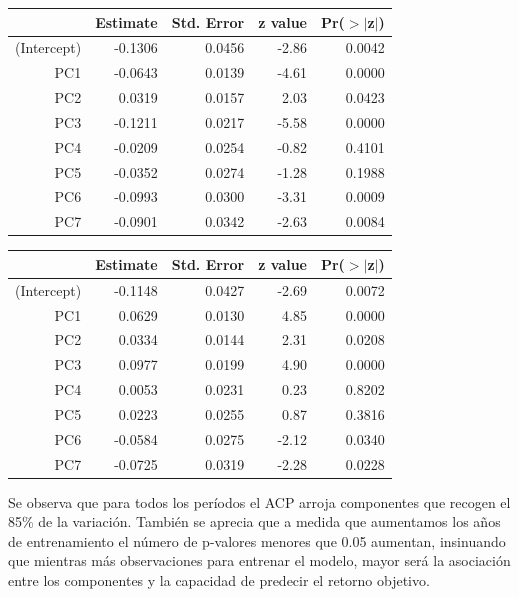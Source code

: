 \documentclass[a4paper,12pt]{Latex/Classes/PhDthesisPSnPDF}
\begin{document}
\begin{table}[ht]
\centering
\begin{tabular}{rrrrr}
  \hline
 & Estimate & Std. Error & z value & Pr($>$$|$z$|$) \\ 
  \hline
(Intercept) & -0.1306 & 0.0456 & -2.86 & 0.0042 \\ 
  PC1 & -0.0643 & 0.0139 & -4.61 & 0.0000 \\ 
  PC2 & 0.0319 & 0.0157 & 2.03 & 0.0423 \\ 
  PC3 & -0.1211 & 0.0217 & -5.58 & 0.0000 \\ 
  PC4 & -0.0209 & 0.0254 & -0.82 & 0.4101 \\ 
  PC5 & -0.0352 & 0.0274 & -1.28 & 0.1988 \\ 
  PC6 & -0.0993 & 0.0300 & -3.31 & 0.0009 \\ 
  PC7 & -0.0901 & 0.0342 & -2.63 & 0.0084 \\ 
   \hline
\end{tabular}
\end{table}\newpage
{}
\begin{table}[ht]
\centering
\begin{tabular}{rrrrr}
  \hline
 & Estimate & Std. Error & z value & Pr($>$$|$z$|$) \\ 
  \hline
(Intercept) & -0.1148 & 0.0427 & -2.69 & 0.0072 \\ 
  PC1 & 0.0629 & 0.0130 & 4.85 & 0.0000 \\ 
  PC2 & 0.0334 & 0.0144 & 2.31 & 0.0208 \\ 
  PC3 & 0.0977 & 0.0199 & 4.90 & 0.0000 \\ 
  PC4 & 0.0053 & 0.0231 & 0.23 & 0.8202 \\ 
  PC5 & 0.0223 & 0.0255 & 0.87 & 0.3816 \\ 
  PC6 & -0.0584 & 0.0275 & -2.12 & 0.0340 \\ 
  PC7 & -0.0725 & 0.0319 & -2.28 & 0.0228 \\ 
   \hline
\end{tabular}
\end{table}
Se observa que para todos los períodos el ACP arroja componentes que recogen el 85\% de la variación. También se aprecia que a medida que aumentamos los años de entrenamiento el número de p-valores menores que 0.05 aumentan, insinuando que mientras más observaciones para entrenar el modelo, mayor será la asociación entre los componentes y la capacidad de predecir el retorno objetivo.
\\
\end{document}
